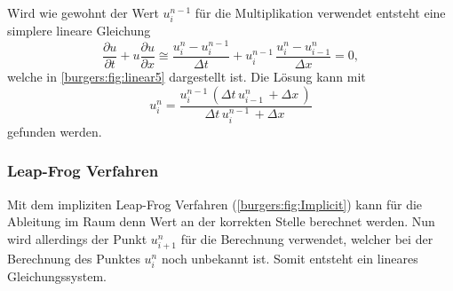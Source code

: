 		Wird wie gewohnt der Wert  $u_{i}^{n-1}$ f\"ur die Multiplikation verwendet entsteht eine simplere lineare Gleichung
	    \begin{equation}
		\frac {\partial u}{\partial t}+u{\frac {\partial u}{\partial x}} \cong \frac{u_{i}^{n}-u_{i}^{n-1}}{\Delta t}+ u_{i}^{n-1}\, \frac{u_{i}^{n}-u_{i-1}^{n}}{\Delta x}=0,
		\label{burgers:eq:imp_lin}
		\end{equation}
		welche in \autoref{burgers:fig:linear5} dargestellt ist.
	    Die L\"osung kann mit
	    \begin{equation}
		 u_{i}^{n} = \frac{u^{n-1}_{i}\, \left(\Delta{t}\, u^{n}_{i-1}\, + \Delta{x}\,\right)}{\Delta{t}\, u^{n-1}_{i}\, + \Delta{x}\,}
		 \label{burgers:eq:imp_lin_sol}
		\end{equation}
	    gefunden werden.

	\subsubsection{Leap-Frog Verfahren}

		Mit dem impliziten Leap-Frog Verfahren (\autoref{burgers:fig:Implicit}) kann f\"ur die Ableitung im Raum denn Wert an der korrekten Stelle berechnet werden.
		Nun wird allerdings der Punkt  $u_{i+1}^{n}$ f\"ur die Berechnung verwendet, welcher bei der Berechnung des Punktes  $u_{i}^{n}$ noch unbekannt ist.
		Somit entsteht ein lineares Gleichungssystem.

